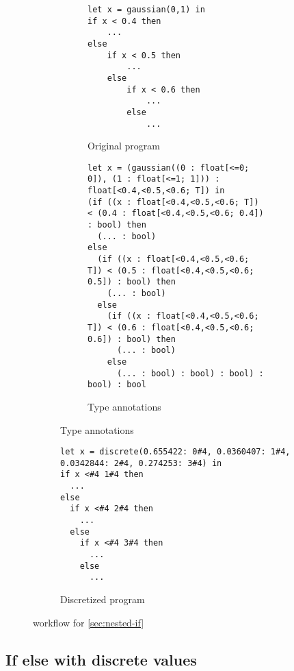\documentclass[acmsmall,screen,dvipsnames,x11names,nonacm,anonymous,review]{acmart}
\newcommand{\contdice}{\text{\scshape ContDice}\xspace}
\begin{document}
\begin{figure}[ht]
\centering
\begin{subfigure}[t]{0.48\textwidth}  %
  \centering
  \begin{subfigure}[t]{\textwidth}
    \begin{lstlisting}
let x = gaussian(0,1) in 
if x < 0.4 then 
    ...
else
    if x < 0.5 then 
        ...
    else
        if x < 0.6 then 
            ...
        else
            ...
    \end{lstlisting}
    \caption{Original program}
    \label{fig:subA}
  \end{subfigure}

  \vspace{2em} %

  \begin{subfigure}[t]{\textwidth}
    \begin{lstlisting}
let x = (gaussian((0 : float[<=0; 0]), (1 : float[<=1; 1])) : float[<0.4,<0.5,<0.6; T]) in
(if ((x : float[<0.4,<0.5,<0.6; T]) < (0.4 : float[<0.4,<0.5,<0.6; 0.4]) : bool) then
  (... : bool)
else
  (if ((x : float[<0.4,<0.5,<0.6; T]) < (0.5 : float[<0.4,<0.5,<0.6; 0.5]) : bool) then
    (... : bool)
  else
    (if ((x : float[<0.4,<0.5,<0.6; T]) < (0.6 : float[<0.4,<0.5,<0.6; 0.6]) : bool) then
      (... : bool)
    else
      (... : bool) : bool) : bool) : bool) : bool
    \end{lstlisting}
    \caption{Type annotations}
    \label{fig:subC}
  \end{subfigure}
\end{subfigure}
\hfill
\begin{subfigure}[t]{0.48\textwidth}
  \begin{lstlisting}
let x = discrete(0.655422: 0#4, 0.0360407: 1#4, 
0.0342844: 2#4, 0.274253: 3#4) in
if x <#4 1#4 then
  ...
else
  if x <#4 2#4 then
    ...
  else
    if x <#4 3#4 then
      ...
    else
      ...
  \end{lstlisting}
  \caption{Discretized program}
  \label{fig:subB}
\end{subfigure}

\caption{\contdice workflow for \ref{sec:nested-if}}
\label{fig:main}
\end{figure}


\subsection{If else with discrete values}
\label{sec:discrete-if}
\end{document}

